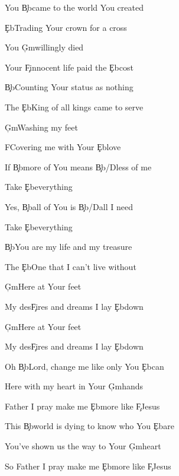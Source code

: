 \documentclass[9pt]{extarticle}
\begin{document}
\bsong

\bi

\ei

\bv
You \c{Bb}came to the world You created

\c{Eb}Trading Your crown for a cross

You \c{Gm}willingly died

Your \c{F}innocent life paid the \c{Eb}cost
\ev

\bv
\c{Bb}Counting Your status as nothing

The \c{Eb}King of all kings came to serve

\c{Gm}Washing my feet

FCovering me with Your \c{Eb}love
\ev

\bc
If \c{Bb}more of You means \c{Bb/D}less of me

Take \c{Eb}everything

Yes, \c{Bb}all of You is \c{Bb/D}all I need

Take \c{Eb}everything
\ec

\bv
\c{Bb}You are my life and my treasure

The \c{Eb}One that I can't live without

\c{Gm}Here at Your feet

My des\c{F}ires and dreams I lay \c{Eb}down

\c{Gm}Here at Your feet

My des\c{F}ires and dreams I lay \c{Eb}down
\ev


\bb[2]
Oh \c{Bb}Lord, change me like only You \c{Eb}can

Here with my heart in Your \c{Gm}hands

Father I pray make me \c{Eb}more like \c{F}Jesus

This \c{Bb}world is dying to know who You \c{Eb}are

You've shown us the way to Your \c{Gm}heart

So Father I pray make me \c{Eb}more like \c{F}Jesus
\eb


\esong
\end{document}
